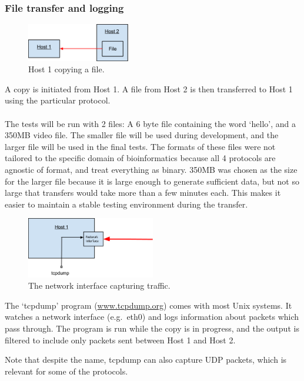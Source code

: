 \documentclass{sig-alternate-05-2015}
\begin{document}
\subsubsection{File transfer and logging}
\begin{figure}[H]
	\label{fig:copy_example}
	\centering
	\includegraphics[width=0.4\textwidth]{img/basic_transfer_example.png}
	\caption{Host 1 copying a file.}
\end{figure}
A copy is initiated from Host 1. A file from Host 2 is then transferred to Host 1 using the particular protocol.
\\\\
The tests will be run with 2 files: A 6 byte file containing the word `hello', and a 350MB video file. The smaller file will be used during development, and the larger file will be used in the final tests. The formats of these files were not tailored to the specific domain of bioinformatics because all 4 protocols are agnostic of format, and treat everything as binary. 350MB was chosen as the size for the larger file because it is large enough to generate sufficient data, but not so large that transfers would take more than a few minutes each. This makes it easier to maintain a stable testing environment during the transfer.
\begin{figure}[H]
	\label{fig:interface_example}
	\centering
	\includegraphics[width=0.5\textwidth]{img/if_example.png}
	\caption{The network interface capturing traffic.}
\end{figure}
The `tcpdump' program (\url{www.tcpdump.org}) comes with most Unix systems. It watches a network interface (e.g.\ eth0) and logs information about packets which pass through. The program is run while the copy is in progress, and the output is filtered to include only packets sent between Host 1 and Host 2.

Note that despite the name, tcpdump can also capture UDP packets, which is relevant for some of the protocols.
\end{document}
